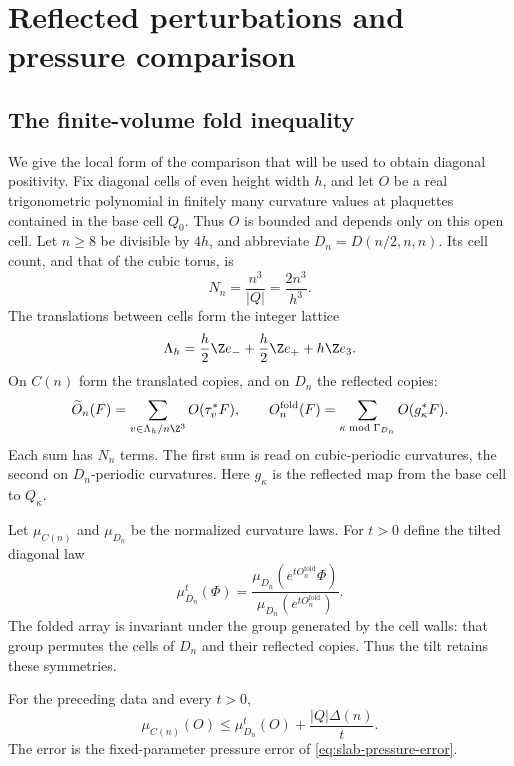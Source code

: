 \section{Reflected perturbations and pressure comparison}\label{sec:diagonal-positivity}

\subsection{The finite-volume fold inequality}\label{subsec:slab-finite-fold}

We give the local form of the comparison that will be used to obtain
diagonal positivity. Fix diagonal cells of even height width $h$,
and let $O$ be a real trigonometric polynomial in finitely many
curvature values at plaquettes contained in the base cell $Q_0$.
Thus $O$ is bounded and depends only on this open cell. Let $n\ge8$
be divisible by $4h$, and abbreviate $D_n=D(n/2,n,n)$. Its cell
count, and that of the cubic torus, is
\[
 N_n=\frac{n^3}{|Q|}=\frac{2n^3}{h^3}.
\]
The translations between cells form the integer lattice
\[
 \Lambda_h=\frac h2\Z e_-+\frac h2\Z e_++h\Z e_3.
\]
On $C(n)$ form the translated copies, and on $D_n$ the reflected
copies:
\begin{equation}\label{eq:slab-two-arrays}
 \widetilde O_n(F)=\sum_{v\in\Lambda_h/n\Z^3}O(\tau_v^*F),
 \qquad O_n^{\mathrm{fold}}(F)=\sum_{\kappa\bmod\Gamma_{D_n}}
                                                O(g_\kappa^*F).
\end{equation}
Each sum has $N_n$ terms. The first sum is read on cubic-periodic
curvatures, the second on $D_n$-periodic curvatures. Here $g_\kappa$
is the reflected map from the base cell to $Q_\kappa$.

Let $\mu_{C(n)}$ and $\mu_{D_n}$ be the normalized curvature laws.
For $t>0$ define the tilted diagonal law
\begin{equation}\label{eq:slab-tilted-law}
 \mu_{D_n}^t(\Phi)=
 \frac{\mu_{D_n}(e^{tO_n^{\mathrm{fold}}}\Phi)}
      {\mu_{D_n}(e^{tO_n^{\mathrm{fold}}})}.
\end{equation}
The folded array is invariant under the group generated by the cell
walls: that group permutes the cells of $D_n$ and their reflected
copies. Thus the tilt retains these symmetries.

\begin{proposition}\label{prop:slab-finite-fold}
For the preceding data and every $t>0$,
\begin{equation}\label{eq:slab-finite-fold}
 \mu_{C(n)}(O)\le\mu_{D_n}^t(O)+\frac{|Q|\Delta(n)}{t}.
\end{equation}
The error is the fixed-parameter pressure error of
\eqref{eq:slab-pressure-error}.
\end{proposition}

